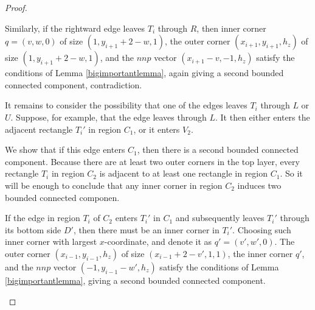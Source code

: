 \documentclass{amsart}[10pt]
\theoremstyle{plain}
\theoremstyle{definition}
\begin{document}
\begin{proof}
\begin{enumerate}
Similarly, if the rightward edge leaves $T_i$ through $R$, then inner corner $q=(v,w,0)$ of size $(1, y_{i+1}+2-w,1)$, the outer corner $(x_{i+1},y_{i+1},h_z)$ of size $(1, y_{i+1}+2-w,1)$, and the $nnp$ vector $(x_{i+1}-v,-1, h_z)$ satisfy the conditions of Lemma \ref{bigimportantlemma}, again giving a second bounded connected component, contradiction.

It remains to consider the possibility that one of the edges leaves $T_i$ through $L$ or $U$. Suppose, for example, that the edge leaves through $L$. It then either enters the adjacent rectangle $T_i'$ in region $C_1$, or it enters $V_2$. 

We show that if this edge enters $C_1$, then there is a second bounded connected component. Because there are at least two outer corners in the top layer, every rectangle $T_i$ in region $C_2$ is adjacent to at least one rectangle in region $C_1$. So it will be enough to conclude that any inner corner in region $C_2$ induces two bounded connected componen.

If the edge in region $T_i$ of $C_2$ enters $T_i'$ in $C_1$ and subsequently leaves $T_i'$ through its bottom side $D'$, then there must be an inner corner in $T_i'$. Choosing  such inner corner with largest $x$-coordinate, and denote it as $q'=(v',w',0)$. The outer corner $(x_{i-1},y_{i-1},h_z)$ of size $(x_{i-1}+2-v',1, 1)$, the inner corner $q'$, and the $nnp$ vector $(-1,y_{i-1}-w', h_z)$ satisfy the conditions of Lemma \ref{bigimportantlemma}, giving a second bounded connected component.


\end{enumerate}
\end{proof}
\end{document}
